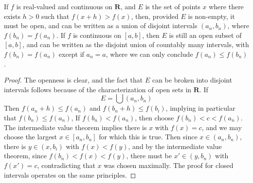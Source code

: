 \begin{lemma}
    If $f$ is real-valued and continuous on $\mathbf{R}$, and $E$ is the set of points $x$ where there exists $h > 0$ such that $f(x+h) > f(x)$, then, provided $E$ is non-empty, it must be open, and can be written as a union of disjoint intervals $(a_n,b_n)$, where $f(b_n) = f(a_n)$. If $f$ is continuous on $[a,b]$, then $E$ is still an open subset of $[a,b]$, and can be written as the disjoint union of countably many intervals, with $f(b_n) = f(a_n)$ except if $a_n = a$, where we can only conclude $f(a_n) \leq f(b_n)$.
\end{lemma}
\begin{proof}
  The openness is clear, and the fact that $E$ can be broken into disjoint intervals follows because of the characterization of open sets in $\mathbf{R}$. If
  \[ E = \bigcup (a_n,b_n) \]
  Then $f(a_n + h) \leq f(a_n)$ and $f(b_n + h) \leq f(b_i)$, implying in particular that $f(b_n) \leq f(a_n)$, If $f(b_n) < f(a_n)$, then choose $f(b_n) < c < f(a_n)$. The intermediate value theorem implies there is $x$ with $f(x) = c$, and we may choose the largest $x \in [a_n,b_n]$ for which this is true. Then since $x \in (a_n,b_n)$, there is $y \in (x,b_i)$ with $f(x) < f(y)$, and by the intermediate value theorem, since $f(b_n) < f(x) < f(y)$, there must be $x' \in (y,b_n)$ with $f(x') = c$, contradicting that $x$ was chosen maximally. The proof for closed intervals operates on the same principles.
\end{proof}

